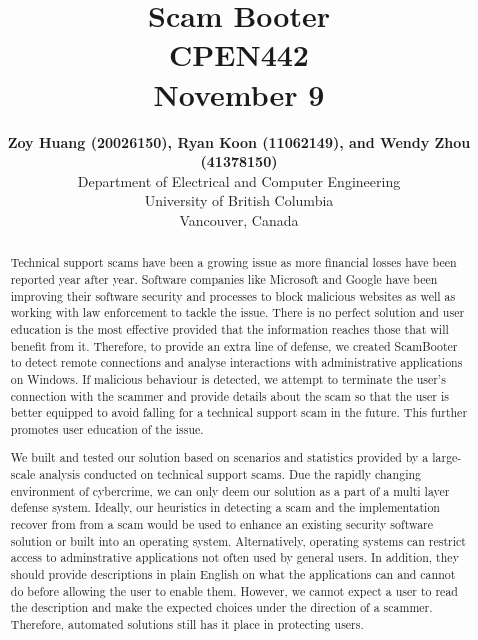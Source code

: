 \documentclass[final]{IEEEtran}
\begin{document}
\title{ Scam Booter\\\vspace*{10pt} \LARGE CPEN442 \\\vspace*{10pt} \large November 9}
\author{\textbf{Zoy Huang (20026150), Ryan Koon (11062149), and Wendy Zhou (41378150)}\\
Department of Electrical and Computer Engineering\\
University of British Columbia\\
Vancouver, Canada

}
\maketitle

\begin{abstract}
Technical support scams have been a growing issue as more financial losses have been reported year after year. Software companies like Microsoft and Google have been improving their software security and processes to block malicious websites as well as working with law enforcement to tackle the issue. There is no perfect solution and user education is the most effective provided that the information reaches those that will benefit from it. Therefore, to provide an extra line of defense, we created ScamBooter to detect remote connections and analyse interactions with administrative applications on Windows. If malicious behaviour is detected, we attempt to terminate the user’s connection with the scammer and provide details about the scam so that the user is better equipped to avoid falling for a technical support scam in the future. This further promotes user education of the issue.

We built and tested our solution based on scenarios and statistics provided by a large-scale analysis conducted on technical support scams. Due the rapidly changing environment of cybercrime, we can only deem our solution as a part of a multi layer defense system. Ideally, our heuristics in detecting a scam and the implementation recover from from a scam would be used to enhance an existing security software solution or built into an operating system. Alternatively, operating systems can restrict access to adminstrative applications not often used by general users. In addition, they should provide descriptions in plain English on what the applications can and cannot do before allowing the user to enable them. However, we cannot expect a user to read the description and make the expected choices under the direction of a scammer. Therefore, automated solutions still has it place in protecting users.
\end{abstract}
\end{document}
